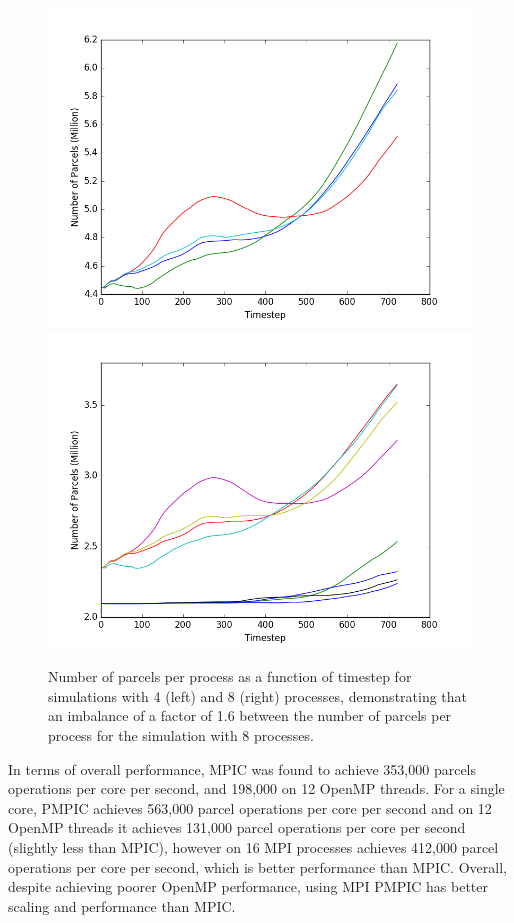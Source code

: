 \documentclass{article}
\begin{document}
\begin{figure}
  \begin{center}
    \includegraphics[scale=0.35]{pmpic_images/4p.png}
    \includegraphics[scale=0.35]{pmpic_images/8p.png}
  \end{center}
  \caption{Number of parcels per process as a function of timestep for simulations with 4 (left) and 8 (right) processes, demonstrating that an imbalance of a factor of 1.6 between the number of parcels per process for the simulation with 8 processes.}
  \label{parcel imbalance}
\end{figure}

In terms of overall performance, MPIC was found to achieve 353,000 parcels operations per core per second, and 198,000 on 12 OpenMP threads. For a single core, PMPIC achieves 563,000 parcel operations per core per second and on 12 OpenMP threads it achieves 131,000 parcel operations per core per second (slightly less than MPIC), however on 16 MPI processes achieves 412,000 parcel operations per core per second, which is better performance than MPIC. Overall, despite achieving poorer OpenMP performance, using MPI PMPIC has better scaling and performance than MPIC.
\end{document}
